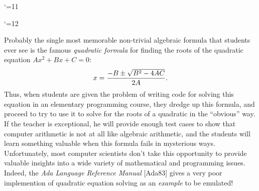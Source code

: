 \documentclass[twocolumn,epsf]{snBaker}
\begin{document}
\maketitle

\catcode`\@=11

\def\eqalign#1{\null\,\vcenter{\openup\jot \m@th
  \ialign{\strut\hfil$\displaystyle{##}$&$
      \displaystyle{{}##}$\hfil \crcr#1\crcr}}\,}

\def\eqalignno#1{\displ@y \tabskip=\@centering
  \halign to\displaywidth{\hfil$\@lign\displaystyle{##}$
    \tabskip=0pt &$\@lign\displaystyle{{}##}$
    \hfil\tabskip=\@centering
    &\llap{$\@lign##$}\tabskip=0pt\crcr #1\crcr}}

\def\leqalignno#1{\displ@y \tabskip=\centering
  \halign to\displaywidth{\hfil$\@lign\displaystyle{##}$
    \tabskip=0pt &$\@lign\displaystyle{{}##}$
    \hfil\tabskip=\centering &\kern-\displaywidth\rlap{$\@lign##$}
    \tabskip=\displaywidth\crcr #1\crcr}}

\catcode`\@=12

\def\mywedge{\char'136}
\def\mytilde{\char'176}
\def\jacobi#1#2{\hbox{$\left({#1\over #2}\right)$}}
\def\sign#1{\hbox{\rm sgn}(#1)}
\def\ceil#1{\hbox{\rm ceil}(#1)}
\def\floor#1{\hbox{\rm floor}(#1)}
\def\xp#1{\hbox{\rm xp}(#1)}
\def\xpp#1{\hbox{\rm xp2}(#1)}
\def\mn#1{\hbox{\rm mn}(#1)}
\def\mnn#1{\hbox{\rm mn2}(#1)}
\def\asin{\hbox{\rm asin}}
\def\acos{\hbox{\rm acos}}
\def\cis{\hbox{\rm cis}}
\def\acosh{\hbox{\rm acosh}}
\def\asinh{\hbox{\rm asinh}}
\newtheorem{theorem}{Theorem}
\newtheorem{definition}{Definition}


Probably the single most memorable non-trivial algebraic formula that
students ever see is the famous {\it quadratic formula} for
finding the roots of the quadratic equation $Ax^2+Bx+C=0$:
$$x={-B\pm\sqrt{B^2-4AC}\over 2A}.$$
Thus, when students are given the problem of writing code
for solving this equation in an elementary programming course, they
dredge up this formula, and proceed to try to use it to solve for the
roots of a quadratic in the ``obvious'' way.  If the teacher is
exceptional, he will provide enough test cases to show that computer
arithmetic is not at all like algebraic arithmetic, and the students
will learn something valuable when this formula fails in mysterious
ways.  Unfortunately, most computer scientists don't take this
opportunity to provide valuable insights into a wide variety of
mathematical and programming issues.  Indeed, the {\it Ada Language Reference Manual}
[Ada83] gives a very poor implemention of quadratic
equation solving as an {\it example} to be emulated!
\end{document}
